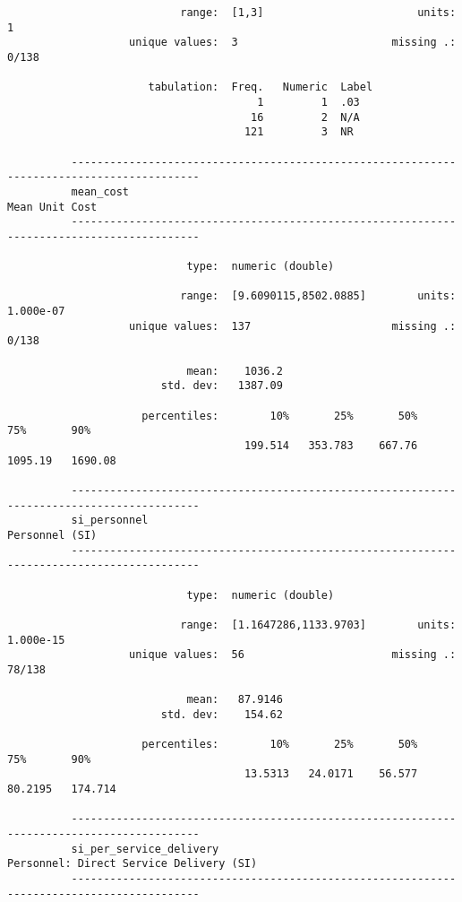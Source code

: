 \documentclass{article}
\begin{document}
\begin{verbatim}
                           range:  [1,3]                        units:  1
                   unique values:  3                        missing .:  0/138
          
                      tabulation:  Freq.   Numeric  Label
                                       1         1  .03
                                      16         2  N/A
                                     121         3  NR
          
          ------------------------------------------------------------------------------------------
          mean_cost                                                                   Mean Unit Cost
          ------------------------------------------------------------------------------------------
          
                            type:  numeric (double)
          
                           range:  [9.6090115,8502.0885]        units:  1.000e-07
                   unique values:  137                      missing .:  0/138
          
                            mean:    1036.2
                        std. dev:   1387.09
          
                     percentiles:        10%       25%       50%       75%       90%
                                     199.514   353.783    667.76   1095.19   1690.08
          
          ------------------------------------------------------------------------------------------
          si_personnel                                                                Personnel (SI)
          ------------------------------------------------------------------------------------------
          
                            type:  numeric (double)
          
                           range:  [1.1647286,1133.9703]        units:  1.000e-15
                   unique values:  56                       missing .:  78/138
          
                            mean:   87.9146
                        std. dev:    154.62
          
                     percentiles:        10%       25%       50%       75%       90%
                                     13.5313   24.0171    56.577   80.2195   174.714
          
          ------------------------------------------------------------------------------------------
          si_per_service_delivery                            Personnel: Direct Service Delivery (SI)
          ------------------------------------------------------------------------------------------
          

\end{verbatim}
\end{document}
